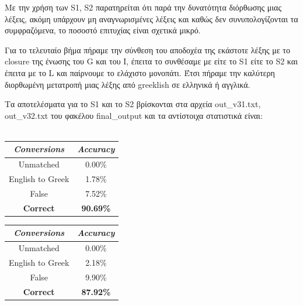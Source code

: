 \documentclass{article}
\begin{document}
Με την χρήση των \textlatin{S1, S2} παρατηρείται ότι παρά την δυνατότητα διόρθωσης μιας λέξεις, ακόμη υπάρχουν μη αναγνωρισμένες λέξεις και καθώς δεν συνυπολογίζονται τα συμφραζόμενα, το ποσοστό επιτυχίας είναι σχετικά μικρό. \par
Για το τελευταίο βήμα πήραμε την σύνθεση του αποδοχέα της εκάστοτε λέξης με το \textlatin{closure} της ένωσης του \textlatin{G} και του Ι, έπειτα το συνθέσαμε με είτε το \textlatin{S1} είτε το \textlatin{S2} και έπειτα με το \textlatin{L} και παίρνουμε το ελάχιστο μονοπάτι. Έτσι πήραμε την καλύτερη διορθωμένη μετατροπή μιας λέξης από \textlatin{greeklish} σε ελληνικά ή αγγλικά. \par
Τα αποτελέσματα για το \textlatin{S1} και το \textlatin{S2} βρίσκονται στα αρχεία \textlatin{out\_v31.txt, out\_v32.txt} του φακέλου \textlatin{final\_output} και τα αντίστοιχα στατιστικά είναι: \\
\\
\begin{minipage}{0.45\textwidth}
	\centering
	\begin{tabular}{|| c | c ||}
	\hline
	\textit{\textlatin{Conversions}} & \textit{\textlatin{Accuracy}} \\ [0.5ex]
	\hline\hline
	\textlatin{Unmatched} & 0.00\% \\
	\hline
	\textlatin{English to Greek} & 1.78\% \\
	\hline
	\textlatin{False} & 7.52\% \\
	\hline
	\textbf{\textlatin{Correct}} & \textbf{90.69\%} \\ [1ex]
	\hline
	\end{tabular}
\end{minipage}\hfill
\begin{minipage}{0.45\textwidth}
	\centering
	\begin{tabular}{|| c | c ||}
	\hline
	\textit{\textlatin{Conversions}} & \textit{\textlatin{Accuracy}} \\ [0.5ex]
	\hline\hline
	\textlatin{Unmatched} & 0.00\% \\
	\hline
	\textlatin{English to Greek} & 2.18\% \\
	\hline
	\textlatin{False} & 9.90\% \\
	\hline
	\textbf{\textlatin{Correct}} & \textbf{87.92\%} \\ [1ex]
	\hline
	\end{tabular}
\end{minipage} \\
\\
\end{document}
